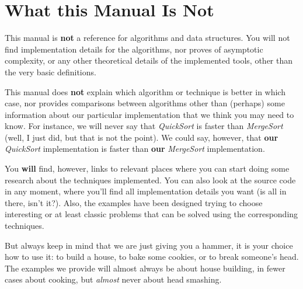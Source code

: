 \section*{What this Manual Is Not}

This manual is \textbf{not} a reference for algorithms and
data structures. You will not find implementation details for the
algorithms, nor proves of asymptotic complexity, or any other
theoretical details of the implemented tools, other than the very
basic definitions.

This manual does \textbf{not} explain which algorithm or technique
is better in which case, nor provides comparisons between algorithms 
other than (perhaps) some information about our particular implementation
that we think you may need to know. For instance, we will never say
that \emph{QuickSort} is faster than \emph{MergeSort} (well, I just did, but
that is not the point). We could say, however, that \textbf{our} \emph{QuickSort}
implementation is faster than \textbf{our} \emph{MergeSort} implementation.

You \textbf{will} find, however, links to
relevant places where you can start doing some research
about the techniques implemented. You can also look at the
source code in any moment, where you'll find all implementation
details you want (is all in there, isn't it?). Also, the
examples have been designed trying to choose interesting or at least
classic problems that can be solved using the corresponding
techniques. 

But always keep in mind that we are just giving you
a hammer, it is your choice how to use it: to build a house,
to bake some cookies, or to break someone's head. The examples
we provide will almost always be about house building, in fewer
cases about cooking, but \emph{almost} never about head smashing. 